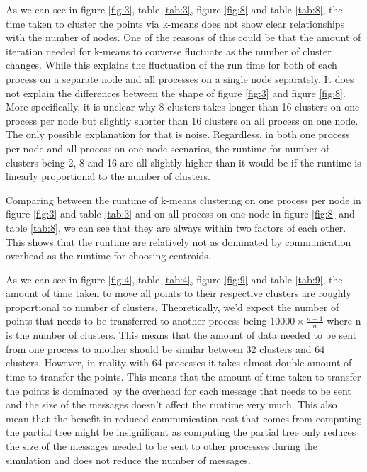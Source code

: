 \documentclass{article}
\begin{document}
As we can see in figure \ref{fig:3}, table \ref{tab:3}, figure \ref{fig:8} and table \ref{tab:8},
the time taken to cluster the points via k-means does not show clear relationships with the number
of nodes. One of the reasons of this could be that the amount of iteration needed for k-means to
converse fluctuate as the number of cluster changes. While this explains the fluctuation of the run
time for both of each process on a separate node and all processes on a single node separately. It
does not explain the differences between the shape of figure \ref{fig:3} and figure \ref{fig:8}.
More specifically, it is unclear why 8 clusters takes longer than 16 clusters on one process per
node but slightly shorter than 16 clusters on all process on one node. The only possible explanation
for that is noise. Regardless, in both one process per node and all process on one node scenarios,
the runtime for number of clusters being 2, 8 and 16 are all slightly higher than it would be if
the runtime is linearly proportional to the number of clusters.

Comparing between the runtime of k-means clustering on one process per node in figure \ref{fig:3}
and table \ref{tab:3} and on all process on one node in figure \ref{fig:8} and table \ref{tab:8}, we
can see that they are always within two factors of each other. This shows that the runtime are
relatively not as dominated by communication overhead as the runtime for choosing centroids.

As we can see in figure \ref{fig:4}, table \ref{tab:4}, figure \ref{fig:9} and table \ref{tab:9},
the amount of time taken to move all points to their respective clusters are roughly proportional to
number of clusters. Theoretically, we'd expect the number of points that needs to be transferred to
another process being \(10000 \times \frac{n-1}{n}\) where n is the number of clusters. This means
that the amount of data needed to be sent from one process to another should be similar between 32
clusters and 64 clusters. However, in reality with 64 processes it takes almost double amount of
time to transfer the points. This means that the amount of time taken to transfer the points is
dominated by the overhead for each message that needs to be sent and the size of the messages
doesn't affect the runtime very much. This also mean that the benefit in reduced communication cost
that comes from computing the partial tree might be insignificant as computing the partial tree only
reduces the size of the messages needed to be sent to other processes during the simulation and does
not reduce the number of messages.
\end{document}
